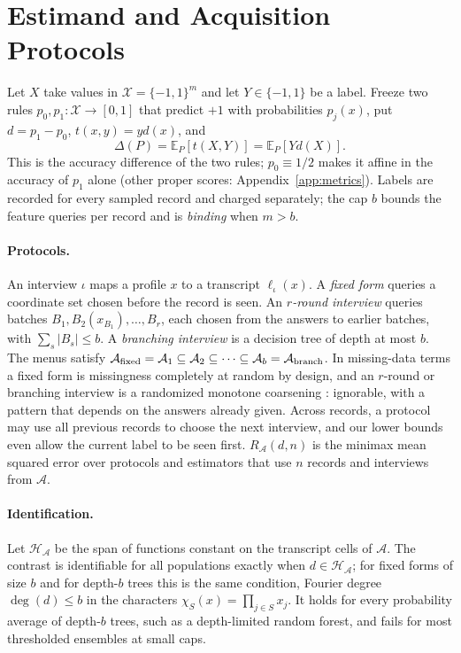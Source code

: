 \documentclass{article}
\newcommand{\E}{\mathbb{E}}
\newcommand{\X}{\mathcal X}
\newcommand{\A}{\mathcal A}
\newcommand{\Hh}{\mathcal H}
\begin{document}
\section{Estimand and Acquisition Protocols}\label{sec:setup}
Let $X$ take values in $\X=\{-1,1\}^m$ and let $Y\in\{-1,1\}$ be a label. Freeze two rules $p_0,p_1:\X\to[0,1]$ that predict $+1$ with probabilities $p_j(x)$, put $d=p_1-p_0$, $t(x,y)=yd(x)$, and
\begin{equation}
 \Delta(P)=\E_P[t(X,Y)]=\E_P[Yd(X)].\label{eq:gain}
\end{equation}
This is the accuracy difference of the two rules; $p_0\equiv1/2$ makes it affine in the accuracy of $p_1$ alone (other proper scores: Appendix~\ref{app:metrics}). Labels are recorded for every sampled record and charged separately; the cap $b$ bounds the feature queries per record and is \emph{binding} when $m>b$.

\paragraph{Protocols.}
An interview $\iota$ maps a profile $x$ to a transcript $\ell_\iota(x)$. A \emph{fixed form} queries a coordinate set chosen before the record is seen. An \emph{$r$-round interview} queries batches $B_1,B_2(x_{B_1}),\ldots,B_r$, each chosen from the answers to earlier batches, with $\sum_s|B_s|\le b$. A \emph{branching interview} is a decision tree of depth at most $b$. The menus satisfy $\A_{\rm fixed}=\A_1\subseteq\A_2\subseteq\cdots\subseteq\A_b=\A_{\rm branch}$. In missing-data terms a fixed form is missingness completely at random by design, and an $r$-round or branching interview is a randomized monotone coarsening \citep{gill1997}: ignorable, with a pattern that depends on the answers already given. Across records, a protocol may use all previous records to choose the next interview, and our lower bounds even allow the current label to be seen first. $R_\A(d,n)$ is the minimax mean squared error over protocols and estimators that use $n$ records and interviews from $\A$.

\paragraph{Identification.}
Let $\Hh_\A$ be the span of functions constant on the transcript cells of $\A$. The contrast is identifiable for all populations exactly when $d\in\Hh_\A$; for fixed forms of size $b$ and for depth-$b$ trees this is the same condition, Fourier degree $\deg(d)\le b$ in the characters $\chi_S(x)=\prod_{j\in S}x_j$. It holds for every probability average of depth-$b$ trees, such as a depth-limited random forest, and fails for most thresholded ensembles at small caps.
\end{document}
